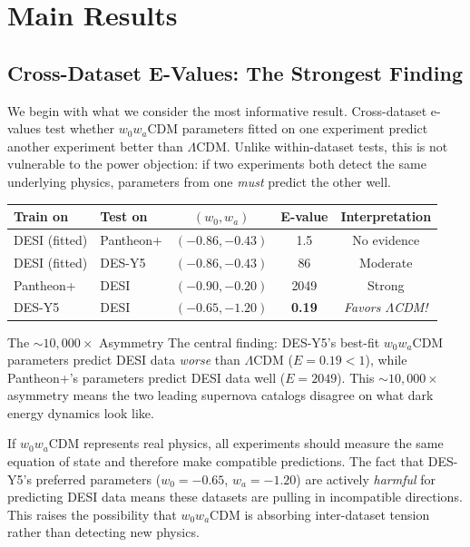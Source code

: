 \documentclass[11pt,a4paper]{article}
\newcommand{\LCDM}{$\Lambda$CDM}
\begin{document}
\section{Main Results}
\label{sec:results}

\subsection{Cross-Dataset E-Values: The Strongest Finding}
\label{sec:crossresults}

We begin with what we consider the most informative result. Cross-dataset e-values test whether $w_0w_a$CDM parameters fitted on one experiment predict another experiment better than \LCDM. Unlike within-dataset tests, this is not vulnerable to the power objection: if two experiments both detect the same underlying physics, parameters from one \textit{must} predict the other well.

\begin{center}
\begin{tabular}{llccc}
\toprule
\textbf{Train on} & \textbf{Test on} & $(w_0, w_a)$ & \textbf{E-value} & \textbf{Interpretation}\\
\midrule
DESI (fitted) & Pantheon+ & $(-0.86, -0.43)$ & 1.5 & No evidence \\
DESI (fitted) & DES-Y5 & $(-0.86, -0.43)$ & 86 & Moderate \\
Pantheon+ & DESI & $(-0.90, -0.20)$ & 2049 & Strong \\
DES-Y5 & DESI & $(-0.65, -1.20)$ & \textbf{0.19} & \textit{Favors \LCDM!} \\
\bottomrule
\end{tabular}
\end{center}

\begin{conceptbox}{The ${\sim}10{,}000\times$ Asymmetry}
The central finding: DES-Y5's best-fit $w_0w_a$CDM parameters predict DESI data \textit{worse} than \LCDM{} ($E = 0.19 < 1$), while Pantheon+'s parameters predict DESI data well ($E = 2049$). This ${\sim}10{,}000\times$ asymmetry means the two leading supernova catalogs disagree on what dark energy dynamics look like.

If $w_0w_a$CDM represents real physics, all experiments should measure the same equation of state and therefore make compatible predictions. The fact that DES-Y5's preferred parameters ($w_0 = -0.65$, $w_a = -1.20$) are actively \textit{harmful} for predicting DESI data means these datasets are pulling in incompatible directions. This raises the possibility that $w_0w_a$CDM is absorbing inter-dataset tension rather than detecting new physics.
\end{conceptbox}
\end{document}
